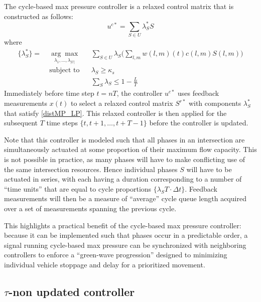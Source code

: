 The cycle-based max pressure controller is a relaxed control matrix that is constructed as follows:
\begin{equation} \label{uc*}
u^{c*} = \sum_{S \in U}\lambda_{S}^{*}S
\end{equation} 
where 
\begin{align} \nonumber
\{ \lambda^*_S \} = \; & \underset{\lambda_{1},...,\lambda_{\vert U\vert}}{ \arg \max} & & \sum_{S \in U}\lambda_{S}\Big(\sum_{l,m} w(l,m)(t)c(l,m) S(l,m)\Big)  \\
\nonumber & \text{subject to}
\nonumber & &  \lambda_{S} \geq \kappa_s\\
&&&\sum_{S} \lambda_{S} \leq 1 - \tfrac{L}{T}  \label{distMP_LP}
\end{align}
Immediately before time step $t=nT$, the controller $u^{c*}$ uses feedback measurements $x(t)$ to select a relaxed control matrix $S^{r*}$ with components $\lambda_S^*$ that satisfy \eqref{distMP_LP}. This relaxed controller is then applied for the subsequent $T$ time steps $\{t, t+1, \ldots, t+T-1\}$ before the controller is updated. 

Note that this controller is modeled such that all phases in an intersection are simultaneously actuated at some proportion of their maximum flow capacity. This is not possible in practice, as many phases will have to make conflicting use of the same intersection resources. Hence individual phases $S$ will have to be actuated in series, with each having a duration corresponding to a number of ``time units'' that are equal to cycle proportions $\{\lambda_S T\cdot  \Delta t\}$. Feedback measurements will then be a measure of ``average'' cycle queue length acquired over a set of measurements spanning the previous cycle. 

This highlights a practical benefit of the cycle-based max pressure controller: because it can be implemented such that phases occur in a predictable order, a signal running cycle-based max pressure can be synchronized with neighboring controllers to enforce a ``green-wave progression'' designed to minimizing individual vehicle stoppage and delay for a prioritized movement. 


\subsection*{$\tau$-non updated controller}

